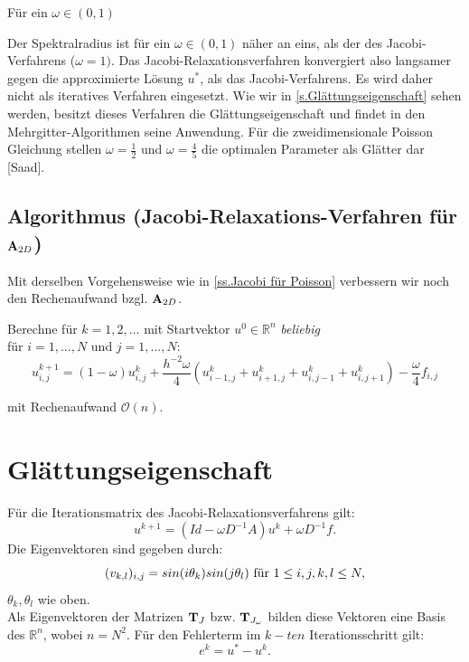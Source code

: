 Für ein $\omega \in (0,1)$ 

Der Spektralradius ist für ein $\omega \in (0,1)$ näher an eins, als der des Jacobi-Verfahrens ($\omega = 1)$. Das Jacobi-Relaxationsverfahren konvergiert also langsamer gegen die approximierte Lösung $u^{*}$, als das Jacobi-Verfahrens. Es wird daher nicht als iteratives Verfahren eingesetzt. Wie wir in \autoref{s.Glättungseigenschaft} sehen werden, besitzt dieses Verfahren die Glättungseigenschaft und findet in den Mehrgitter-Algorithmen seine Anwendung. Für die zweidimensionale Poisson Gleichung stellen $\omega = \frac{1}{2}$ und $\omega = \frac{4}{5}$ die optimalen Parameter als Glätter dar [Saad].

\subsection{Algorithmus (Jacobi-Relaxations-Verfahren für ${\textbf{A}}_{2D}$)}\label{ss.Algorithmus Jacobi Relax Poisson}

Mit derselben Vorgehensweise wie in \autoref{ss.Jacobi für Poisson} verbessern wir noch den Rechenaufwand bzgl. ${\textbf{A}}_{2D}$.

Berechne für $k = 1,2,...$ mit Startvektor $u^{0} \in \mathbb{R}^{n}$ \textit{beliebig}\\
für $i = 1,...,N$ und $j = 1,...,N$:
\begin{equation}
u^{k+1}_{i,j} = (1 - \omega) u^{k}_{i,j} + \frac{h^{-2} \omega}{4} (u^{k}_{i-1,j} + u^{k}_{i+1,j} + u^{k}_{i,j-1} + u^{k}_{i,j+1}) - \frac{\omega}{4} f_{i,j}
\end{equation}

mit Rechenaufwand $\mathcal{O}(n)$.

\section{Glättungseigenschaft}\label{s.Glättungseigenschaft}

Für die Iterationsmatrix des Jacobi-Relaxationsverfahrens gilt:
\begin{equation}
u^{k+1} = (Id - \omega D^{-1}A)u^{k} + \omega D^{-1}f.
\end{equation}
Die Eigenvektoren sind gegeben durch:
\begin{equation}
(v_{k,l})_{i,j} = sin(i \theta_{k})sin(j \theta_{l}) \textnormal{ für } 1 \le i,j,k,l \le N,
\end{equation}
$\theta_{k}, \theta_{l}$ wie oben.\\
Als Eigenvektoren der Matrizen ${\textbf{T}}_{J}$ bzw. ${\textbf{T}}_{J_{\omega}}$ bilden diese Vektoren eine Basis des $\mathbb{R}^{n}$, wobei $n = N^{2}$.
Für den Fehlerterm im $k-ten$ Iterationsschritt gilt:
\begin{equation}
e^{k} = u^{*} - u^{k}.
\end{equation}

